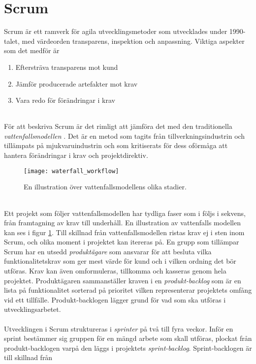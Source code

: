 \section{Scrum}
\label{sec:scrum}
Scrum är ett ramverk för agila utvecklingsmetoder som utvecklades under 1990-talet, med värdeorden
transparens, inspektion och anpassning.\cite{website:scrum_guide} Viktiga aspekter som det medför är 
\begin{enumerate}
\item Eftersträva transparens mot kund
\item Jämför producerade artefakter mot krav
\item Vara redo för förändringar i krav
\end{enumerate}
\ \\
För att beskriva Scrum är det rimligt att jämföra det med den traditionella
\textit{vattenfallsmodellen} .\cite{production_of_large_computer_programs}
Det är en metod som tagits från tillverkningsindustrin och tillämpats på mjukvaruindustrin och
som kritiserats för dess oförmåga att hantera förändringar i krav och projektdirektiv.
\begin{figure}[H]
  \centering
  \texttt{[image: waterfall\_workflow]}
  \caption{En illustration över vattenfallsmodellens olika stadier.}
  \label{fig:waterfall_workflow}
\end{figure}
\ \\
Ett projekt som följer vattenfallsmodellen har tydliga
faser som i följs i sekvens, från framtagning av krav till underhåll. En illustration av vattenfalls
modellen kan ses i figur \ref{fig:waterfall_workflow}.
Till skillnad från vattenfallsmodellen ristas krav ej i sten inom Scrum, och olika moment i
projektet kan itereras på. En grupp som tillämpar Scrum har en utsedd \textit{produktägare}
som ansvarar för att besluta vilka funktionalitetskrav som ger mest värde för kund och i
vilken ordning det bör utföras. Krav kan även omformuleras, tillkomma och
kasseras genom hela projektet. Produktägaren sammanställer kraven i en \textit{produkt-backlog}
som är en lista på funktionalitet sorterad på prioritet vilken representerar projektets
omfång vid ett tillfälle. Produkt-backlogen lägger grund för vad som ska utföras i utvecklingsarbetet.
\\ \\
Utvecklingen i Scrum struktureras i \textit{sprinter} på två till fyra veckor. Inför en sprint
bestämmer sig gruppen för en mängd arbete som skall utföras, plockat från produkt-backlogen
varpå den läggs i projektets \textit{sprint-backlog}. Sprint-backlogen är till skillnad från
